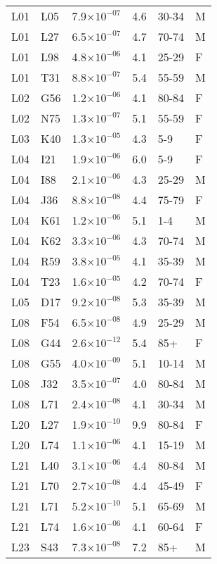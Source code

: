 \begin{longtable}{lllrll}
   L01 & L05 & 7.9$\times10^{-07}$ & 4.6 & 30-34 & M \\ 
   L01 & L27 & 6.5$\times10^{-07}$ & 4.7 & 70-74 & M \\ 
   L01 & L98 & 4.8$\times10^{-06}$ & 4.1 & 25-29 & F \\ 
   L01 & T31 & 8.8$\times10^{-07}$ & 5.4 & 55-59 & M \\ 
   L02 & G56 & 1.2$\times10^{-06}$ & 4.1 & 80-84 & F \\ 
   L02 & N75 & 1.3$\times10^{-07}$ & 5.1 & 55-59 & F \\ 
   L03 & K40 & 1.3$\times10^{-05}$ & 4.3 & 5-9 & F \\ 
   L04 & I21 & 1.9$\times10^{-06}$ & 6.0 & 5-9 & F \\ 
   L04 & I88 & 2.1$\times10^{-06}$ & 4.3 & 25-29 & M \\ 
   L04 & J36 & 8.8$\times10^{-08}$ & 4.4 & 75-79 & F \\ 
   L04 & K61 & 1.2$\times10^{-06}$ & 5.1 & 1-4 & M \\ 
   L04 & K62 & 3.3$\times10^{-06}$ & 4.3 & 70-74 & M \\ 
   L04 & R59 & 3.8$\times10^{-05}$ & 4.1 & 35-39 & M \\ 
   L04 & T23 & 1.6$\times10^{-05}$ & 4.2 & 70-74 & F \\ 
   L05 & D17 & 9.2$\times10^{-08}$ & 5.3 & 35-39 & M \\ 
   L08 & F54 & 6.5$\times10^{-08}$ & 4.9 & 25-29 & M \\ 
   L08 & G44 & 2.6$\times10^{-12}$ & 5.4 & 85+ & F \\ 
   L08 & G55 & 4.0$\times10^{-09}$ & 5.1 & 10-14 & M \\ 
   L08 & J32 & 3.5$\times10^{-07}$ & 4.0 & 80-84 & M \\ 
   L08 & L71 & 2.4$\times10^{-08}$ & 4.1 & 30-34 & M \\ 
   L20 & L27 & 1.9$\times10^{-10}$ & 9.9 & 80-84 & F \\ 
   L20 & L74 & 1.1$\times10^{-06}$ & 4.1 & 15-19 & M \\ 
   L21 & L40 & 3.1$\times10^{-06}$ & 4.4 & 80-84 & M \\ 
   L21 & L70 & 2.7$\times10^{-08}$ & 4.4 & 45-49 & F \\ 
   L21 & L71 & 5.2$\times10^{-10}$ & 5.1 & 65-69 & M \\ 
   L21 & L74 & 1.6$\times10^{-06}$ & 4.1 & 60-64 & F \\ 
   L23 & S43 & 7.3$\times10^{-08}$ & 7.2 & 85+ & M \\ 

\end{longtable}

